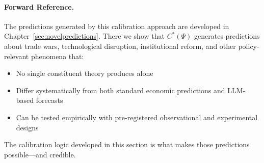 
\paragraph{Forward Reference.}
The predictions generated by this calibration approach are developed in
Chapter~\ref{sec:novelpredictions}. There we show that $C^*(\Psi)$ generates
predictions about trade wars, technological disruption, institutional reform,
and other policy-relevant phenomena that:
\begin{itemize}
    \item No single constituent theory produces alone
    \item Differ systematically from both standard economic predictions and
          LLM-based forecasts
    \item Can be tested empirically with pre-registered observational and
          experimental designs
\end{itemize}

The calibration logic developed in this section is what makes those predictions
possible---and credible.


